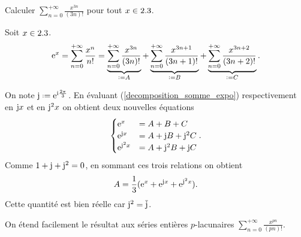 \begin{exercice}
Calculer $\sum\limits_{n=0}^{+ \infty} \frac{x^{3n}}{(3n)!}$ pour tout $x \in 2.3$.
\end{exercice}

\begin{solution}
Soit $x \in 2.3$. 
\begin{align} \label{decomposition_somme_expo}
    \me^x = \sum_{n=0}^{+ \infty} \frac{x^n}{n!} = \underbrace{\sum_{n=0}^{+ \infty} \frac{x^{3n}}{(3n)!}}_{ \defeq A} + \underbrace{\sum_{n=0}^{+ \infty} \frac{x^{3n+1}}{(3n+1)!}}_{\defeq B} + \underbrace{\sum_{n=0}^{+ \infty} \frac{x^{3n+2}}{(3n+2)!}}_{\defeq C}.
\end{align}

\begin{marginfigure}
    
\end{marginfigure}

On note $\mj \defeq \me^{\mi \frac{2\pi}{3}}$. En évaluant (\ref{decomposition_somme_expo}) respectivement en $\mathrm{j} x$ et en $\mathrm{j}^2 x$ on obtient deux nouvelles équations
$$\begin{cases}
    \mathrm{e}^x &= A + B + C \\
    \mathrm{e}^{\mathrm{j} x} &= A + \mathrm{j} B + \mathrm{j}^2 C \\
    \mathrm{e}^{\mathrm{j}^2 x} &= A + \mathrm{j}^2 B + \mathrm{j} C
\end{cases}.$$
Comme $1 + \mathrm{j} + \mathrm{j}^2 = 0$, en sommant ces trois relations on obtient
$$A = \frac{1}{3}(\mathrm{e}^x + \mathrm{e}^{\mathrm{j} x}+ \mathrm{e}^{\mathrm{j}^2 x}).$$
Cette quantité est bien réelle car $\mathrm{j}^2 = \overline{\mathrm{j}}$.
\end{solution}

\begin{remarque}
    On étend facilement le résultat aux séries entières $p$-lacunaires $\sum\limits_{n=0}^{+ \infty} \frac{x^{pn}}{(pn)!}$.
\end{remarque}